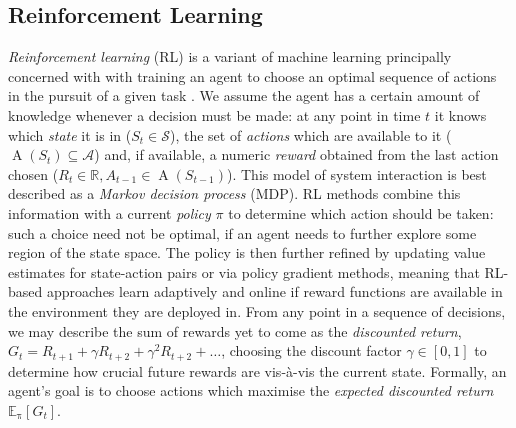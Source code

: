 \documentclass[conference, letterpaper, 10pt, times]{IEEEtran}
\begin{document}
\subsection{Reinforcement Learning}
\emph{Reinforcement learning} (RL) is a variant of machine learning principally concerned with with training an agent to choose an optimal sequence of actions in the pursuit of a given task \cite{RL2E}.
We assume the agent has a certain amount of knowledge whenever a decision must be made: at any point in time $t$ it knows which \emph{state} it is in ($S_t \in \mathcal{S}$), the set of \emph{actions} which are available to it ($\operatorname{A}(S_t) \subseteq \mathcal{A}$) and, if available, a numeric \emph{reward} obtained from the last action chosen ($R_t \in \mathbb{R}, A_{t-1} \in \operatorname{A}(S_{t-1})$).
This model of system interaction is best described as a \emph{Markov decision process} (MDP).
RL methods combine this information with a current \emph{policy} $\pi$ to determine which action should be taken: such a choice need not be optimal, if an agent needs to further explore some region of the state space.
The policy is then further refined by updating value estimates for state-action pairs or via policy gradient methods, meaning that RL-based approaches learn adaptively and online if reward functions are available in the environment they are deployed in.
From any point in a sequence of decisions, we may describe the sum of rewards yet to come as the \emph{discounted return}, $G_t = R_{t+1} + \gamma R_{t+2} + \gamma^2 R_{t+2} + \ldots$, choosing the discount factor $\gamma \in [0,1]$ to determine how crucial future rewards are vis-\`{a}-vis the current state.
Formally, an agent's goal is to choose actions which maximise the \emph{expected discounted return} $\operatorname{\mathbb{E}_{\pi}}[G_t]$.

\end{document}
